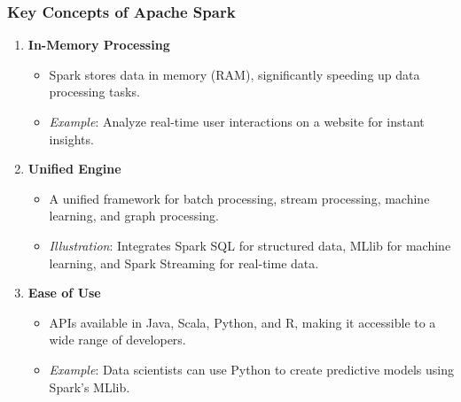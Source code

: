 \documentclass[aspectratio=169]{beamer}
\begin{document}
\begin{frame}[fragile]
    \frametitle{Key Concepts of Apache Spark}
    \begin{enumerate}
        \item \textbf{In-Memory Processing}
            \begin{itemize}
                \item Spark stores data in memory (RAM), significantly speeding up data processing tasks.
                \item \textit{Example}: Analyze real-time user interactions on a website for instant insights.
            \end{itemize}
        
        \item \textbf{Unified Engine}
            \begin{itemize}
                \item A unified framework for batch processing, stream processing, machine learning, and graph processing.
                \item \textit{Illustration}: Integrates Spark SQL for structured data, MLlib for machine learning, and Spark Streaming for real-time data.
            \end{itemize}

        \item \textbf{Ease of Use}
            \begin{itemize}
                \item APIs available in Java, Scala, Python, and R, making it accessible to a wide range of developers.
                \item \textit{Example}: Data scientists can use Python to create predictive models using Spark's MLlib.
            \end{itemize}
    \end{enumerate}
\end{frame}
\end{document}
